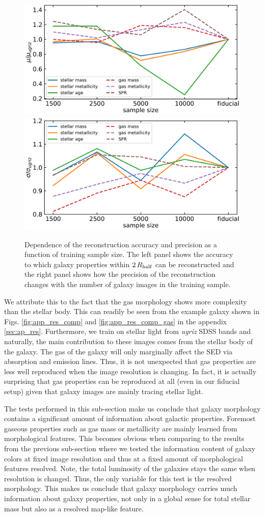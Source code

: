 \documentclass[conference]{IEEEtran}
\begin{document}
\begin{figure}
\begin{center}
\includegraphics[width=.5\textwidth]{./plots/sample_comparison_mu.pdf}
\includegraphics[width=.4875\textwidth]{./plots/sample_comparison_sigma.pdf}
\end{center}
\vspace{-.35cm}
\caption{Dependence of the reconstruction accuracy and precision as a function of training sample size. The left panel shows the accuracy to which galaxy properties within $2\,R_{\rm half}$ can be reconstructed and the right panel shows how the precision of the reconstruction changes with the number of galaxy images in the training sample.}
\label{fig:sample_comp}
\end{figure}

We attribute this to the fact that the gas morphology shows more complexity than the stellar body.
This can readily be seen from the example galaxy shown in Figs. \ref{fig:app_res_comp} and \ref{fig:app_res_comp_gas} in the appendix \ref{sec:ap_res}. Furthermore, we train on stellar light from \emph{ugriz} SDSS bands and naturally, the main contribution to these images comes from the stellar body of the galaxy. The gas of the galaxy will only marginally affect the SED via absorption and emission lines. Thus, it is not unexpected that gas properties are less well reproduced when the image resolution is changing. In fact, it is actually surprising that gas properties can be reproduced at all (even in our fiducial setup) given that galaxy images are mainly tracing stellar light.

The tests performed in this sub-section make us conclude that galaxy morphology contains a significant amount of information about galactic properties. Foremost gaseous properties such as gas mass or metallicity are mainly learned from morphological features. This becomes obvious when comparing to the results from the previous sub-section where we tested the information content of galaxy colors at fixed image resolution and thus at a fixed amount of morphological features resolved. Note, the total luminosity of the galaxies stays the same when resolution is changed. Thus, the only variable for this test is the resolved morphology. This makes us conclude that galaxy morphology carries much information about galaxy properties, not only in a global sense for total stellar mass but also as a resolved map-like feature. 
\end{document}

